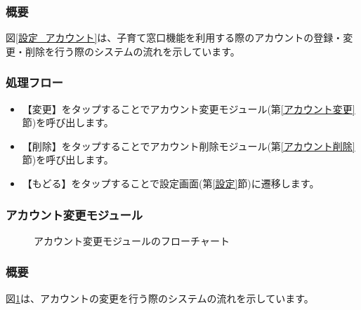 \documentclass[a4j]{jarticle}
\begin{document}
\subsubsection*{概要}
図\ref{設定_アカウント}は、子育て窓口機能を利用する際のアカウントの登録・変更・削除を行う際のシステムの流れを示しています。
\subsubsection*{処理フロー}
\begin{itemize}
\item 【変更】をタップすることでアカウント変更モジュール(第\ref{アカウント変更}節)を呼び出します。
\item 【削除】をタップすることでアカウント削除モジュール(第\ref{アカウント削除}節)を呼び出します。
\item 【もどる】をタップすることで設定画面(第\ref{設定}節)に遷移します。
\end{itemize}

\subsubsection{アカウント変更モジュール\label{アカウント変更}} %
\begin{figure}[H]
    \begin{center}
    \caption {アカウント変更モジュールのフローチャート}
    \label{設定_アカウント変更}
    \end{center}
\end{figure}
\subsubsection*{概要}
図\ref{設定_アカウント変更}は、アカウントの変更を行う際のシステムの流れを示しています。
\end{document}
